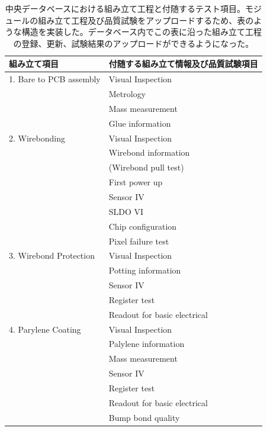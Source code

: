 \begin{table}[btp]
\begin{center}
\caption[中央データベースにおける組み立て工程と付随するテスト項目]{中央データベースにおける組み立て工程と付随するテスト項目。モジュールの組み立て工程及び品質試験をアップロードするため、表のような構造を実装した。データベース内でこの表に沿った組み立て工程の登録、更新、試験結果のアップロードができるようになった。}
\label{pd_stage_structure}
  \scriptsize
  \begin{tabular}{|ll|} \hline
    組み立て項目 & 付随する組み立て情報及び品質試験項目 \\ \hline
    1. Bare to PCB assembly & Visual Inspection \\ 
                            & Metrology \\
                            & Mass measurement \\
                            & Glue information \\\hline
    2. Wirebonding          & Visual Inspection \\ 
                            & Wirebond information \\
                            & (Wirebond pull test)\\
                            & First power up\\
                            & Sensor IV\\
                            & SLDO VI\\
                            & Chip configuration\\
                            & Pixel failure test\\\hline

    3. Wirebond Protection  & Visual Inspection \\ 
                            & Potting information \\
                            & Sensor IV \\
                            & Register test\\
                            & Readout for basic electrical \\\hline

    4. Parylene Coating     & Visual Inspection \\ 
                            & Palylene information \\
                            & Mass measurement \\
                            & Sensor IV \\
                            & Register test\\
                            & Readout for basic electrical \\
                            & Bump bond quality \\\hline


\end{tabular}
\end{center}
\end{table}

